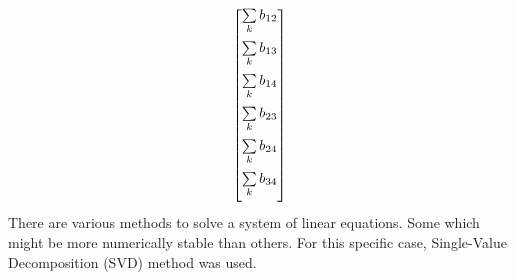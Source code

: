 \documentclass[14pt]{article}
\begin{document}
\begin{itemize}
\begin{align}
\begin{bmatrix}
  \vspace{5px}
   \sum\limits_{k}b_{12}  \\
  \vspace{5px}
   \sum\limits_{k}b_{13}  \\
  \vspace{5px}
   \sum\limits_{k}b_{14}  \\
  \vspace{5px}
   \sum\limits_{k}b_{23}  \\
  \vspace{5px}
   \sum\limits_{k}b_{24}  \\
  \vspace{5px}
   \sum\limits_{k}b_{34}  \\
\end{bmatrix}
\end{align}
There are various methods to solve a system of linear equations. Some which might
be more numerically stable than others. For this specific case, Single-Value Decomposition (SVD)
method was used. 


\end{itemize}
\end{document}
